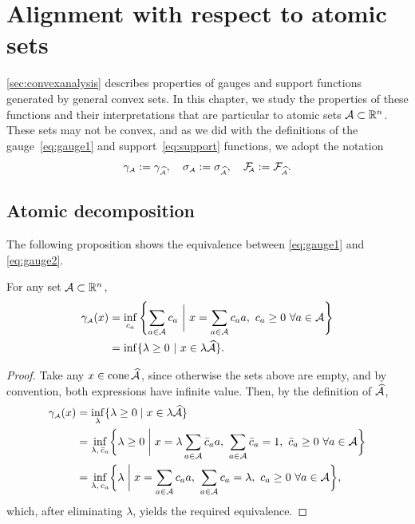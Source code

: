 \section{Alignment with respect to atomic sets} \label{sec:convexanalysis-atomic}

\autoref{sec:convexanalysis} describes properties of gauges and support functions
generated by general convex sets. In this chapter, we study the properties of
these functions and their interpretations that are particular to atomic sets
$\mathcal{A}\subset\mathbb{R}^n$. These sets may not be convex, and as we did with the
definitions of the gauge~\eqref{eq:gauge1} and support~\eqref{eq:support}
functions, we adopt the notation
\[
  \gamma_{\scriptscriptstyle\mathcal{A}}:=\gamma_{\scriptscriptstyle\widehat{\mathcal{A}}},
  \quad \sigma_{\scriptscriptstyle\mathcal{A}}:=\sigma_{\scriptscriptstyle\widehat{\mathcal{A}}},
  \quad \mathcal{F}_{\!\!\scriptscriptstyle\mathcal{A}}:=\mathcal{F}_{\scriptscriptstyle\widehat{\mathcal{A}}}.
\]


\subsection{Atomic decomposition}

The following proposition shows the equivalence between \eqref{eq:gauge1} and \eqref{eq:gauge2}. 

  \begin{proposition}
    \label{prop-guage-equivalence}
    For any set $\mathcal{A}\subset\mathbb{R}^n$,
    \begin{equation*}
      \begin{aligned}
      \gamma_{\scriptscriptstyle\mathcal{A}}(x)
      &=\inf_{c_a} \left\{ \sum_{a\in\mathcal{A}}c_a ~\bigg\vert~ x = \sum_{a\in\mathcal{A}}c_aa,\ c_a \ge0\ \forall a\in\mathcal{A} \right\}
    \\&=\inf\{\lambda\ge0~|~x\in\lambda\widehat{\mathcal{A}}\}.
      \end{aligned}
    \end{equation*}
  \end{proposition}
  \begin{proof}
    Take any $x\in\operatorname{cone}\widehat{\mathcal{A}}$, since otherwise the sets above are
    empty, and by convention, both expressions have infinite
    value. Then, by the definition of $\widehat{\mathcal{A}}$,
    \begin{align*}
      \gamma_{\scriptscriptstyle\mathcal{A}}(x)
      &= \inf_\lambda\{\lambda\ge0 \mid x\in\lambda\widehat{\mathcal{A}}\}
    \\&= \inf_{\lambda,\,\bar c_a}\biggl\{\lambda\ge0 \biggm| x = \lambda\sum_{a\in\mathcal{A}}\bar c_aa,\ \sum_{a\in\mathcal{A}}\bar c_a=1,\ \bar c_a\ge0\ \forall a\in\mathcal{A}\biggr\}
    \\&=  \inf_{\lambda,\,c_a}\biggl\{\lambda \biggm| x = \sum_{a\in\mathcal{A}}c_aa,\ \sum_{a\in\mathcal{A}}c_a=\lambda,\ c_a\ge0\ \forall a\in\mathcal{A}\biggr\},
    \end{align*}
    which, after eliminating $\lambda$, yields the required equivalence.
  \end{proof}

